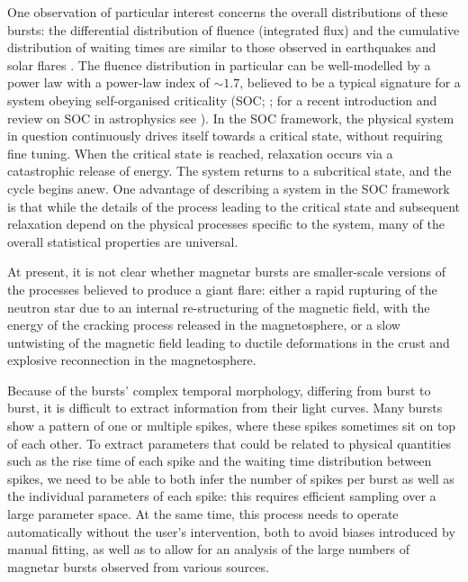 \documentclass[12pt]{emulateapj}
\begin{document}
One observation of particular interest concerns the overall distributions of these bursts: the differential distribution of fluence (integrated flux) and 
the cumulative distribution of waiting times are similar to those observed in earthquakes and solar flares \citep{cheng1996,gogus1999,gogus2000,prieskorn2012}. The fluence distribution
in particular can be well-modelled by a power law with a power-law index of $\sim\!\! 1.7$, believed to be a typical signature for a system obeying 
self-organised criticality (SOC; \citealp{bak1987,bak1988}; for a recent introduction and review on SOC in astrophysics see \citealp{aschwanden2014}). 
In the SOC framework, the physical system in question continuously drives itself towards a critical state,
without requiring fine tuning. When the critical state is reached, relaxation occurs via a catastrophic release of energy. The system returns
to a subcritical state, and the cycle begins anew. 
One advantage of describing a system in the SOC framework is that while the details of the process leading to the critical state and subsequent
relaxation depend on the physical processes specific to the system, many of the overall statistical properties are universal.

At present, it is not clear whether magnetar bursts are smaller-scale versions of the processes believed to produce a giant flare:
either a rapid rupturing of the neutron star due to an internal re-structuring of the magnetic field, with the energy of the cracking process
released in the magnetosphere, or a slow untwisting of the magnetic field leading to ductile deformations in the crust and explosive 
reconnection in the magnetosphere.

Because of the bursts' complex temporal morphology, differing from burst to burst, it is difficult to extract information from their light curves. 
Many bursts show a pattern of one or multiple spikes, where these spikes sometimes sit on top of each other. To extract parameters that could be related
to physical quantities such as the rise time of each spike and the waiting time distribution between spikes, we need to be able to both infer the 
number of spikes per burst as well as the individual parameters of each spike: this requires efficient sampling over a large parameter space.
At the same time, this process needs to operate automatically without the user's intervention, both to avoid biases introduced by manual fitting, as well as
 to allow for an analysis of the large numbers of magnetar bursts observed from various sources.
\end{document}
